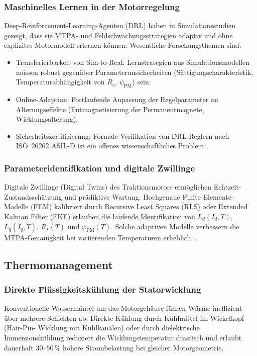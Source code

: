 ﻿\documentclass[a4paper,12pt]{article}
\theoremstyle{definition}
\begin{document}
\subsubsection{Maschinelles Lernen in der Motorregelung}

Deep-Reinforcement-Learning-Agenten (DRL) haben in Simulationsstudien gezeigt,
dass sie MTPA- und Feldschwächungsstrategien adaptiv und ohne explizites
Motormodell erlernen können. Wesentliche Forschungsthemen sind:
\begin{itemize}
    \item Transferierbarkeit von Sim-to-Real: Lernstrategien aus Simulationsmodellen
          müssen robust gegenüber Parameterunsicherheiten (Sättigungscharakteristik,
          Temperaturabhängigkeit von $R_s$, $\psi_{\mathrm{PM}}$) sein.
    \item Online-Adaption: Fortlaufende Anpassung der Regelparameter an
          Alterungseffekte (Entmagnetisierung der Permanentmagnete, Wicklungsalterung).
    \item Sicherheitszertifizierung: Formale Verifikation von DRL-Reglern nach
          ISO~26262 ASIL-D ist ein offenes wissenschaftliches Problem.
\end{itemize}

\subsubsection{Parameteridentifikation und digitale Zwillinge}

Digitale Zwillinge (Digital Twins) des Traktionsmotors ermöglichen Echtzeit-
Zustandsschätzung und prädiktive Wartung. Hochgenaue Finite-Elemente-Modelle
(FEM) kalibriert durch Recursive Least Squares (RLS) oder Extended Kalman Filter
(EKF) erlauben die laufende Identifikation von $L_d(I_d, T)$, $L_q(I_q, T)$,
$R_s(T)$ und $\psi_{\mathrm{PM}}(T)$. Solche adaptiven Modelle verbessern die
MTPA-Genauigkeit bei variierenden Temperaturen erheblich~\cite{belkhier2021observer}.

\subsection{Thermomanagement}

\subsubsection{Direkte Flüssigkeitskühlung der Statorwicklung}

Konventionelle Wassermäntel um das Motorgehäuse führen Wärme ineffizient über
mehrere Schichten ab. Direkte Kühlung durch Kühlmittel im Wickelkopf (Hair-Pin-
Wicklung mit Kühlkanälen) oder durch dielektrische Immersionskühlung reduziert
die Wicklungstemperatur drastisch und erlaubt dauerhaft $30$--$50\,\%$ höhere
Strombelastung bei gleicher Motorgeometrie.
\end{document}
